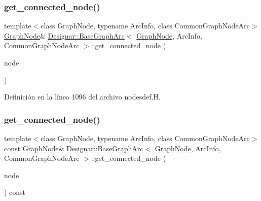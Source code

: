 \subsubsection{\texorpdfstring{get\+\_\+connected\+\_\+node()}{get\_connected\_node()}\hspace{0.1cm}{\footnotesize\ttfamily [1/2]}}
{\footnotesize\ttfamily template$<$class Graph\+Node, typename Arc\+Info, class Common\+Graph\+Node\+Arc$>$ \\
\hyperlink{class_designar_1_1_graph_node}{Graph\+Node}\& \hyperlink{class_designar_1_1_base_graph_arc}{Designar\+::\+Base\+Graph\+Arc}$<$ \hyperlink{class_designar_1_1_graph_node}{Graph\+Node}, Arc\+Info, Common\+Graph\+Node\+Arc $>$\+::get\+\_\+connected\+\_\+node (\begin{DoxyParamCaption}\item[{\hyperlink{class_designar_1_1_graph_node}{Graph\+Node} \&}]{node }\end{DoxyParamCaption})\hspace{0.3cm}{\ttfamily [inline]}}



Definición en la línea 1096 del archivo nodesdef.\+H.

\mbox{\label{class_designar_1_1_base_graph_arc_a5e8a913b9632b653908d054a7e277d7a}} 
\subsubsection{\texorpdfstring{get\+\_\+connected\+\_\+node()}{get\_connected\_node()}\hspace{0.1cm}{\footnotesize\ttfamily [2/2]}}
{\footnotesize\ttfamily template$<$class Graph\+Node, typename Arc\+Info, class Common\+Graph\+Node\+Arc$>$ \\
const \hyperlink{class_designar_1_1_graph_node}{Graph\+Node}\& \hyperlink{class_designar_1_1_base_graph_arc}{Designar\+::\+Base\+Graph\+Arc}$<$ \hyperlink{class_designar_1_1_graph_node}{Graph\+Node}, Arc\+Info, Common\+Graph\+Node\+Arc $>$\+::get\+\_\+connected\+\_\+node (\begin{DoxyParamCaption}\item[{\hyperlink{class_designar_1_1_graph_node}{Graph\+Node} \&}]{node }\end{DoxyParamCaption}) const\hspace{0.3cm}{\ttfamily [inline]}}



